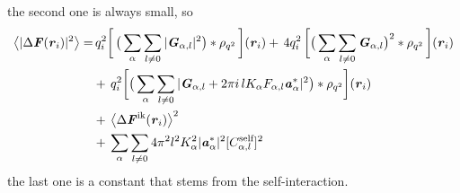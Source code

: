 \documentclass[aps,pre,preprint]{revtex4}
\renewcommand{\v}[1]{\textbf{\textit{#1}}}
\begin{document}
the second one is always small, so
\begin{align}\nonumber
  \big\langle
  \vert \Delta\v F(\v r_i)\vert^2
  \big\rangle
  =&\,
  q_i^2
  \bigg[\,
  \big(
  \sum_{\alpha} \sum_{l\neq 0}
  \vert \v G_{\alpha,l}\vert^2
  \big)
  \ast \rho_{q^2}
  \,\bigg] (\v r_i)
  +\,
  4q_i^2\,
  \bigg[
  \big(
  \sum_{\alpha} \sum_{l\neq 0}  
  \v G_{\alpha,l}
  \big)^2
  \ast \rho_{q^2}\,
  \bigg] (\v r_i) \\\nonumber
  & +\,
  q_i^2
  \bigg[
  \big(
  \sum_{\alpha}\sum_{l\neq 0}
  \vert
  \v G_{\alpha,l} + 2\pi i\,l K_\alpha F_{\alpha,l} \v a_\alpha^\ast\vert^2
  \big)
  \ast \rho_{q^2}
  \bigg]
  (\v r_i) \\ \nonumber
  & +\,
  \big\langle \Delta\v F^{\textrm{ik}}(\v r_i)\big\rangle ^2\\
  &+\,
  \sum_{\alpha}\sum_{l\neq 0}
  4\pi^2l^2K_\alpha^2\vert\v a_{\alpha}^\ast\vert^2[C_{\alpha,l}^{\textrm{self}}]^2 
\end{align}
the last one is a constant that stems from the self-interaction.
\end{document}
